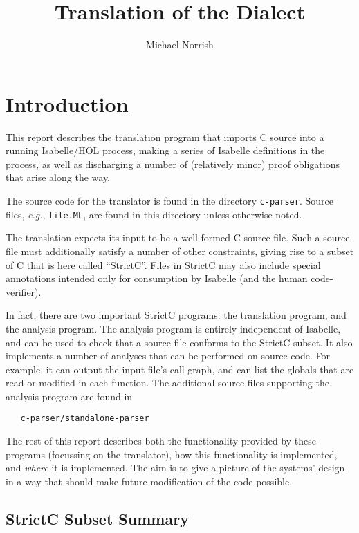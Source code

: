 \documentclass{article}
\title{Translation of the \strictc{} Dialect}
\author{Michael Norrish}
\newcommand{\strictc}{\textsf{StrictC}}
\newcommand{\MLsuffix}{.ML}
\newcommand{\srcfile}[1]{\texttt{#1}}
\newcommand{\MLfile}[1]{\srcfile{#1\MLsuffix}}
\newcommand{\eg}{\textit{e.g.}}
\begin{document}
\maketitle
\tableofcontents

\section{Introduction}
\label{sec:introduction}

This report describes the translation program that imports C source into
a running Isabelle/HOL process, making a series of Isabelle
definitions in the process, as well as discharging a number of
(relatively minor) proof obligations that arise along the way.

The source code for the translator is found in the directory \texttt{c-parser}.
Source files, \eg, \MLfile{file}, are found in this directory unless otherwise noted.

The translation expects its input to be a well-formed C source file.
Such a source file must additionally satisfy a number of other
constraints, giving rise to a subset of C that is here called
``\strictc{}''.  Files in \strictc{} may also include special
annotations intended only for consumption by Isabelle (and the human
code-verifier).

In fact, there are two important \strictc{} programs: the translation
program, and the analysis program.  The analysis program is entirely
independent of Isabelle, and can be used to check that a source file
conforms to the \strictc{} subset.  It also implements a number of
analyses that can be performed on source code.  For example, it can
output the input file's call-graph, and can list the globals that are
read or modified in each function.  The additional source-files
supporting the analysis program are found in
\begin{verbatim}
   c-parser/standalone-parser
\end{verbatim}

The rest of this report describes both the functionality provided by
these programs (focussing on the translator), how this functionality
is implemented, and \emph{where} it is implemented.  The aim is to
give a picture of the systems' design in a way that should make future
modification of the code possible.

\subsection{\strictc{} Subset Summary}
\label{sec:subset-summary}
\end{document}
